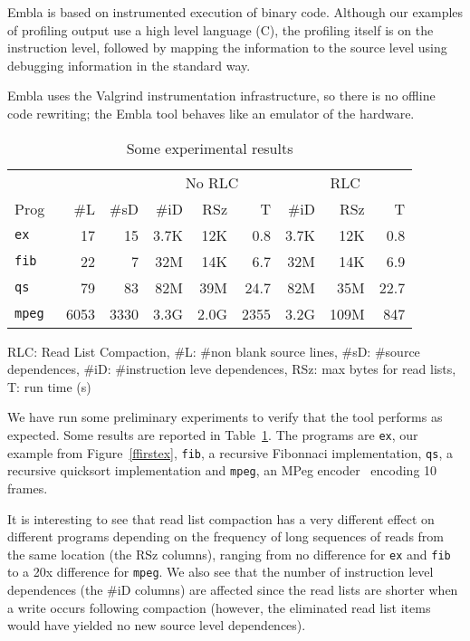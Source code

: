 \documentclass{acm_proc_article-sp}
\begin{document}
Embla is based on instrumented execution of binary code. Although
our examples of profiling output use a high level language (C),
the profiling itself is on the instruction level, followed by 
mapping the information to the source level using debugging information 
in the standard way.

Embla uses the Valgrind instrumentation infrastructure, so there
is no offline code rewriting; the Embla tool behaves like an emulator
of the hardware.

\begin{table}
\begin{center} \newcommand{\sms}{\hskip0.4em}
\begin{tabular}{|@{\sms}l@{\sms}|r@{\sms}r|r@{\sms}r@{\sms}r|r@{\sms}r@{\sms}r|} \hline
 & & & \multicolumn{3}{|c|}{No RLC} & 
\multicolumn{3}{c|}{RLC} \\
Prog & \#L & \#sD & \#iD & RSz & T 
                              & \#iD & RSz & T \\ \hline
\tt ex & 17 & 15 & 3.7K & 12K & 0.8 & 3.7K & 12K & 0.8 \\
\tt fib & 22 & 7 & 32M & 14K & 6.7 & 32M & 14K & 6.9 \\
\tt qs & 79 & 83 & 82M & 39M & 24.7 & 82M & 35M & 22.7 \\
\tt mpeg & 6053 & 3330 & 3.3G & 2.0G & 2355 & 3.2G & 109M & 847 \\ \hline
\end{tabular}
\end{center}
RLC: Read List Compaction, 
\#L: \#non blank source lines, \#sD: \#source dependences, \#iD: 
\#instruction
leve dependences, RSz: max bytes for read lists, T: run time (s)
\caption{Some experimental results} \label{trex}
\end{table}

We have run some preliminary experiments to verify that the tool performs as
expected. Some results are reported in Table~\ref{trex}. The programs are 
{\tt ex}, our example from Figure~\ref{ffirstex}, {\tt fib}, a recursive
Fibonnaci implementation, {\tt qs}, a recursive quicksort implementation 
and {\tt mpeg}, an MPeg encoder~\cite{MPEG} encoding 10 frames.

It is interesting
to see that read list compaction has a very different effect on different 
programs depending on the frequency of long sequences of reads from the same 
location (the RSz columns), ranging from no difference for {\tt ex} and 
{\tt fib} to a 20x difference for {\tt mpeg}. We also see that the number of 
instruction 
level dependences (the \#iD columns) are affected since the read lists 
are shorter when a write occurs following compaction (however, the 
eliminated read list 
items would have yielded no new source level dependences).
\end{document}
